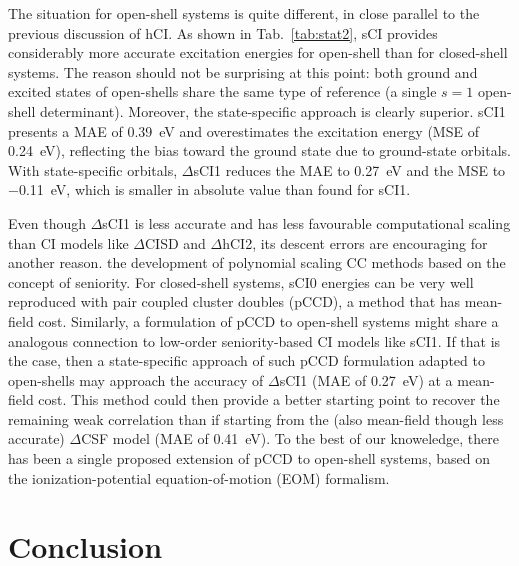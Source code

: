 \documentclass[aip,jcp,reprint,noshowkeys,superscriptaddress]{revtex4-1}
\begin{document}
The situation for open-shell systems is quite different, in close parallel to the previous discussion of hCI.
As shown in Tab.~\ref{tab:stat2}, sCI provides considerably more accurate excitation energies for open-shell than for closed-shell systems.
The reason should not be surprising at this point:
both ground and excited states of open-shells share the same type of reference (a single $s=1$ open-shell determinant).
Moreover, the state-specific approach is clearly superior.
sCI1 presents a MAE of \SI{0.39}{\eV} and overestimates the excitation energy (MSE of \SI{+0.24}{\eV}), reflecting the bias toward the ground state due to ground-state orbitals.
With state-specific orbitals, $\Delta$sCI1 reduces the MAE to \SI{0.27}{\eV} and the MSE to \SI{-0.11}{\eV}, which is smaller in absolute value than found for sCI1.

Even though $\Delta$sCI1 is less accurate and has less favourable computational scaling than CI models like $\Delta$CISD and $\Delta$hCI2,
its descent errors are encouraging for another reason.
the development of polynomial scaling CC methods based on the concept of seniority.
For closed-shell systems, sCI0 energies can be very well reproduced with pair coupled cluster doubles (pCCD), \cite{Kossoski_2021} a method that has mean-field cost.
Similarly, a formulation of pCCD to open-shell systems might share a analogous connection to low-order seniority-based CI models like sCI1.
If that is the case, then a state-specific approach of such pCCD formulation adapted to open-shells may approach the accuracy of $\Delta$sCI1 (MAE of \SI{0.27}{\eV}) at a mean-field cost.
This method could then provide a better starting point to recover the remaining weak correlation than if starting from the (also mean-field though less accurate) $\Delta$CSF model (MAE of \SI{0.41}{\eV}).
To the best of our knoweledge, there has been a single proposed extension of pCCD to open-shell systems, \cite{Boguslawski_2021}
based on the ionization-potential equation-of-motion (EOM) formalism.



\section{Conclusion}
\label{sec:ccl}

\end{document}
